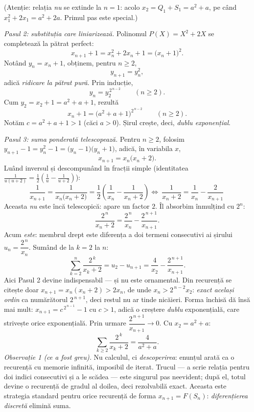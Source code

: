 (Atenție: relația \emph{nu} se extinde la $n=1$: acolo $x_{2}=Q_{1}+S_{1}=a^{2}+a$, pe când $x_{1}^{2}+2x_{1}=a^{2}+2a$. Primul pas este special.)

\emph{Pasul 2: substituția care liniarizează.} Polinomul $P(X)=X^{2}+2X$ se completează la pătrat perfect:
\[ x_{n+1}+1=x_{n}^{2}+2x_{n}+1=\bigl(x_{n}+1\bigr)^{2} . \]
Notând $y_{n}=x_{n}+1$, obținem, pentru $n\ge2$,
\[ y_{n+1}=y_{n}^{2} , \]
adică \emph{ridicare la pătrat pură}. Prin inducție,
\[ y_{n}=y_{2}^{\,2^{\,n-2}}\qquad(n\ge2) . \]
Cum $y_{2}=x_{2}+1=a^{2}+a+1$, rezultă
\[ x_{n}+1=\bigl(a^{2}+a+1\bigr)^{2^{\,n-2}}\qquad(n\ge2) . \]
Notăm $c=a^{2}+a+1>1$ (căci $a>0$). Șirul crește, deci, \emph{dublu exponențial}.

\emph{Pasul 3: suma ponderată telescopează.} Pentru $n\ge2$, folosim $y_{n+1}-1=y_{n}^{2}-1=\bigl(y_{n}-1\bigr)\bigl(y_{n}+1\bigr)$, adică, în variabila $x$,
\[ x_{n+1}=x_{n}\bigl(x_{n}+2\bigr) . \]
Luând inversul și descompunând în fracții simple (identitatea $\frac{1}{u(u+2)}=\frac12\left(\frac1u-\frac{1}{u+2}\right)$):
\[ \frac{1}{x_{n+1}}=\frac{1}{x_{n}\bigl(x_{n}+2\bigr)}=\frac12\left(\frac{1}{x_{n}}-\frac{1}{x_{n}+2}\right) \Longleftrightarrow \boxed{\ \frac{1}{x_{n}+2}=\frac{1}{x_{n}}-\frac{2}{x_{n+1}}\ } \]
Aceasta \emph{nu} este încă telescopică: apare un factor $2$. Îl absorbim înmulțind cu $2^{n}$:
\[ \frac{2^{\,n}}{x_{n}+2}=\frac{2^{\,n}}{x_{n}}-\frac{2^{\,n+1}}{x_{n+1}} . \]
Acum \emph{este}: membrul drept este diferența a doi termeni consecutivi ai șirului $u_{n}=\dfrac{2^{\,n}}{x_{n}}$. Sumând de la $k=2$ la $n$:
\[ \sum_{k=2}^{n}\frac{2^{\,k}}{x_{k}+2}=u_{2}-u_{n+1}=\frac{4}{x_{2}}-\frac{2^{\,n+1}}{x_{n+1}} . \]
Aici Pasul 2 devine indispensabil --- și nu este ornamental. Din recurență se citește doar $x_{n+1}=x_{n}(x_{n}+2)>2x_{n}$, de unde $x_{n}>2^{\,n-2}x_{2}$: \emph{exact același ordin} ca numărătorul $2^{\,n+1}$, deci restul nu ar tinde nicăieri. Forma închisă dă însă mai mult: $x_{n+1}=c^{\,2^{\,n-1}}-1$ cu $c>1$, adică o creștere \emph{dublu} exponențială, care strivește orice exponențială. Prin urmare $\dfrac{2^{\,n+1}}{x_{n+1}}\to0$. Cu $x_{2}=a^{2}+a$:
\[ \sum_{k\ge2}\frac{2^{\,k}}{x_{k}+2}=\frac{4}{a^{2}+a} . \]
\emph{Observație 1 (ce a fost greu).} Nu calculul, ci \emph{descoperirea}: enunțul arată ca o recurență cu memorie infinită, imposibil de iterat. Trucul --- a scrie relația pentru doi indici consecutivi și a le scădea --- este singurul pas neevident; după el, totul devine o recurență de gradul al doilea, deci rezolvabilă exact. Aceasta este strategia standard pentru orice recurență de forma $x_{n+1}=F(S_{n})$: \emph{diferențierea discretă} elimină suma.

